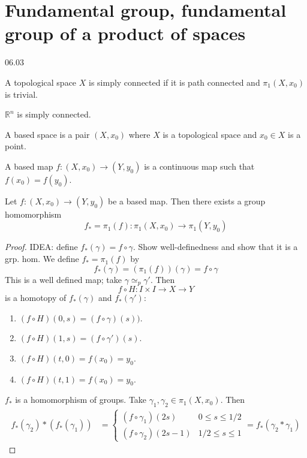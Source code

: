 \section{Fundamental group, fundamental group of a product of spaces}
06.03

\begin{definition}
    A topological space \( X \) is simply connected
    if it is path connected and \( \pi_1(X, x_0) \)
    is trivial.
\end{definition}

\begin{example}
   \( \mathbb{R}^n \) is simply connected.
\end{example}

\begin{definition}
   A based space is a pair \( (X, x_0) \) 
   where \( X \) is a topological space
   and \( x_0 \in X \) is a point.
\end{definition}

\begin{definition}
   A based map \( f: (X, x_0) \to (Y, y_0) \) 
   is a continuous map such that \( f(x_0) = f(y_0) \).
\end{definition}

\begin{proposition}
  \label{prop:based_grp_hom}
  Let \( f: (X, x_0) \to (Y, y_0) \) be a
  based map. Then there exists a group homomorphism
  \[ f_* = \pi_1(f): \pi_1(X, x_0) \to \pi_1(Y, y_0) \]
\end{proposition}

\begin{proof}
    IDEA: define \( f_*(\gamma) = f\circ \gamma \).
    Show well-definedness and show that it is a grp. hom.
    We define \( f_* = \pi_1(f) \) by 
    \[
      f_*(\gamma) = \left(\pi_1(f)\right)(\gamma) = f \circ \gamma
    \]
    This is a well defined map; take \( \gamma \simeq_p \gamma' \).
    Then
    \[
      f \circ H: I \times I \to X \to Y
    \]
    is a homotopy of \( f_*(\gamma) \) and \( f_*(\gamma') \):
    \begin{enumerate}
      \item \( (f \circ H)(0, s) = (f \circ \gamma)(s)) \).
      \item \( (f \circ H)(1, s) = (f \circ \gamma')(s) \).
      \item \( (f \circ H)(t, 0) = f(x_0) = y_0 \).
      \item \( (f \circ H)(t, 1) = f(x_0) = y_0 \).
    \end{enumerate}
    \( f_* \) is a homomorphism of groups.
    Take \( \gamma_1, \gamma_2 \in \pi_1(X, x_0) \).
    Then
    \begin{align*}
      f_*(\gamma_2) * (f_*(\gamma_1))
      &= \begin{cases}
        (f \circ \gamma_1) (2s)     & 0 \le s \le 1/2 \\
        (f \circ \gamma_2) (2s - 1) & 1/2 \le s \le 1
      \end{cases} = f_*(\gamma_2 * \gamma_1)
    \end{align*}
\end{proof}

